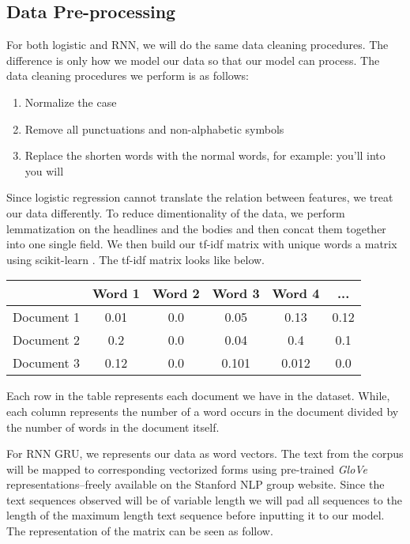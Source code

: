 \documentclass[11.5pt]{article}
\begin{document}
\subsection{Data Pre-processing}

For both logistic and RNN, we will do the same data cleaning procedures. The difference is only how we model our data so that our model can process.
The data cleaning procedures we perform is as follows:

\begin{enumerate}
  \item Normalize the case
  \item Remove all punctuations and non-alphabetic symbols 
  \item Replace the shorten words with the normal words, for example: you'll into you will
\end{enumerate}

Since logistic regression cannot translate the relation between features, we treat our data  differently. 
To reduce dimentionality of the data, we perform lemmatization on the headlines and the bodies and then concat them together into one single field. 
We then build our tf-idf matrix with unique words a matrix using scikit-learn \cite{scikit-learn}. The tf-idf matrix looks like below.

\begin{center}
  \begin{tabular} 
    {|c|c|c|c|c|c|}
    \hline
    & Word 1 & Word 2 & Word 3 & Word 4 & ... \\
    \hline
    Document 1 & 0.01 & 0.0 & 0.05 & 0.13 & 0.12 \\
    \hline
    Document 2 & 0.2 & 0.0 & 0.04 & 0.4 & 0.1 \\
    \hline
    Document 3  & 0.12 & 0.0 & 0.101 & 0.012 & 0.0 \\
    \hline
  \end{tabular}
\end{center}

Each row in the table represents each document we have in the dataset. While, each column represents the number of
a word occurs in the document divided by the number of words in the document itself.

For RNN GRU, we represents our data as word vectors. The text from the corpus will be mapped to corresponding vectorized
forms using  pre-trained \textit{GloVe} 
representations--freely available on the Stanford NLP group website\cite{Bird:2009:NLP:1717171,pennington2014glove}. 
Since the text sequences observed will be of variable length we will pad all 
sequences to the length of the maximum length text sequence before inputting 
it to our model. The representation of the matrix can be seen as follow.
\end{document}
